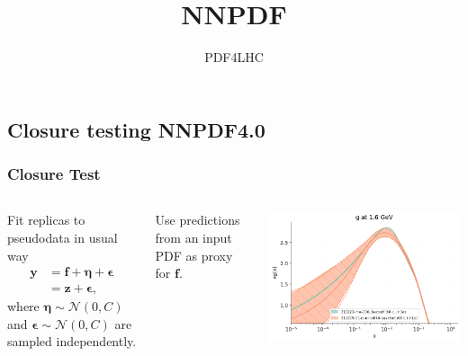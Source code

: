 \newcommand{\shift}{\eta}
\newcommand{\vv}[1]{\boldsymbol{#1}}
\newcommand{\erep}{\mathbf{E}_{\epsilon}}
\newcommand{\eshift}{\mathbf{E}_{\shift}}
\newcommand{\ndata}{N_{\rm data}}
\newcommand\Fontvi{\fontsize{8}{7.2}\selectfont}

\makeatletter
\newcommand{\leqnomode}{\tagsleft@true\let\veqno\@@leqno}
\newcommand{\reqnomode}{\tagsleft@false\let\veqno\@@eqno}
\makeatother

\title{NNPDF}
\author[Michael Wilson]{}
\date{PDF4LHC}

\subsection{Closure testing NNPDF4.0}
\begin{frame}
    \frametitle{Closure Test}
    \Fontvi
    \begin{columns}[t]
    Fit replicas to pseudodata in usual way
    \leqnomode
    \begin{equation}\label{eq:dataassum}
    \begin{split}
        \vv{y} &= \vv{f} + \vv{\shift} + \vv{\epsilon} \\
        &= \vv{z} + \vv{\epsilon},
    \end{split}
    \end{equation}
    where $\vv{\shift} \sim \mathcal{N}(0, C)$ and $\vv{\epsilon} \sim \mathcal{N}(0, C)$ are sampled independently.
    
    Use predictions from an input PDF as proxy for $\vv{f}$.

    \includegraphics[scale=0.3]{closure_test/plot_pdfs_g.png}
    

\end{columns}
\end{frame}
